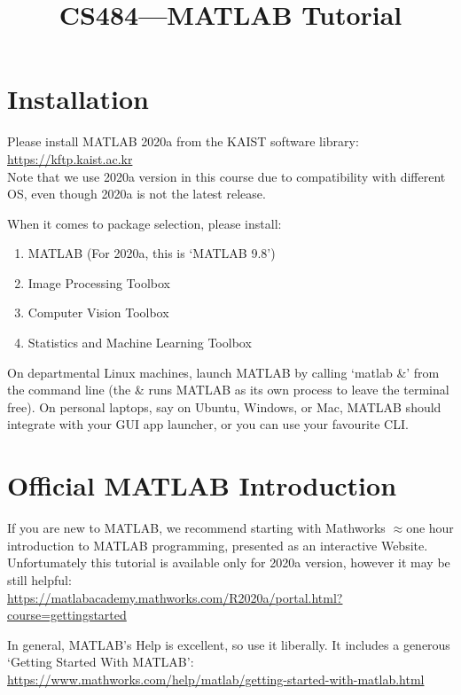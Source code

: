 \documentclass{article}
\date{}
\title{CS484---MATLAB Tutorial}
\begin{document}
\maketitle
\vspace{-2cm}
\thispagestyle{fancy}

\section{Installation}

Please install MATLAB 2020a from the KAIST software library: \href{https://kftp.kaist.ac.kr}{https://kftp.kaist.ac.kr}\\
Note that we use 2020a version in this course due to compatibility with different OS, even though 2020a is not the latest release.

When it comes to package selection, please install:
\begin{enumerate}
    \item MATLAB (For 2020a, this is `MATLAB 9.8')
    \item Image Processing Toolbox
    \item Computer Vision Toolbox
    \item Statistics and Machine Learning Toolbox
\end{enumerate}

On departmental Linux machines, launch MATLAB by calling `matlab \&' from the command line (the \& runs MATLAB as its own process to leave the terminal free). On personal laptops, say on Ubuntu, Windows, or Mac, MATLAB should integrate with your GUI app launcher, or you can use your favourite CLI.

\section{Official MATLAB Introduction}

If you are new to MATLAB, we recommend starting with Mathworks $\approx$one hour introduction to MATLAB programming, presented as an interactive Website. Unfortumately this tutorial is available only for 2020a version, however it may be still helpful:\\
\href{https://matlabacademy.mathworks.com/R2020a/portal.html?course=gettingstarted}{https://matlabacademy.mathworks.com/R2020a/portal.html?course=gettingstarted}

In general, MATLAB's Help is excellent, so use it liberally. It includes a generous `Getting Started With MATLAB':\\
\href{https://www.mathworks.com/help/matlab/getting-started-with-matlab.html}{https://www.mathworks.com/help/matlab/getting-started-with-matlab.html}
\end{document}
